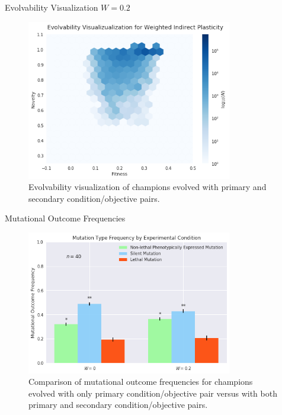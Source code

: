 \begin{frame}{Evolvability Visualization $W=0.2$}
\begin{figure}
    \centering
    \includegraphics[width=0.8\textwidth]{img/ev_w0_2}
 	\captionsetup{singlelinecheck=off,justification=raggedright}
  	\caption{Evolvability visualization of champions evolved with primary and secondary condition/objective pairs.}
    \label{fig:es_w0_2}
\end{figure}
\end{frame}

\begin{frame}{Mutational Outcome Frequencies}
\begin{figure}
    \centering
    \includegraphics[width=0.8\textwidth]{img/mutation_type_indirect}
 	\captionsetup{singlelinecheck=off,justification=raggedright}
  	\caption{Comparison of mutational outcome frequencies for champions evolved with only primary condition/objective pair versus with both primary and secondary condition/objective pairs.}
    \label{fig:mutation_type_indirect}
\end{figure}
\end{frame}


